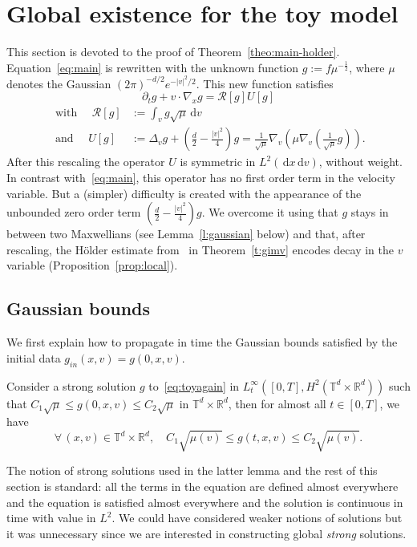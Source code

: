 \documentclass[AHL,Unicode,longabstracts,published]{cedram}
\newcommand{\R}{\mathbb{R}}
\newcommand{\T}{\mathbb{T}}
\newcommand*\fR{\mathcal{R}}
\newcommand{\dd}{{\, \mathrm d}}
\let\oldforall\forall
\renewcommand*{\forall}{\mathrel{\oldforall}}
\begin{document}
\section{Global existence for the toy model}\label{sec:toy}

This section is devoted to the proof of Theorem~\ref{theo:main-holder}. Equation~\eqref{eq:main} is rewritten with the unknown function $g := f \mu^{-\frac12}$, where $\mu$ denotes the Gaussian $(2\pi)^{-d/2} e^{-|v|^2/2}$. This new function satisfies
\begin{equation}\label{eq:toyagain}
\partial_t g + v \cdot \nabla_x g = \fR[g] U[g]
\end{equation}
\begin{align*}
 \text{ with } \quad
\fR[g] &:= \int_v g \sqrt\mu \dd v \\
\text{ and } \quad U[g] &:=
\Delta_v g + \left(\frac{d}2 - \frac{|v|^2}{4}\right) g =
\frac1{\sqrt{\mu}} \nabla_v \left(\mu \nabla_v
\left(\frac{1}{\sqrt{\mu}} g\right)\right).
\end{align*}
After this rescaling the operator $U$ is symmetric in $L^2(\dd x \dd v)$, without weight. In contrast with~\eqref{eq:main}, this operator has no first order term in the velocity variable. But a (simpler) difficulty is created with the appearance of the unbounded zero order term $(\tfrac{d}2 - \tfrac{|v|^2}4)g$. We overcome it using that $g$ stays in between two Maxwellians (see Lemma~\ref{l:gaussian} below) and that, after rescaling, the H\"older estimate from~\cite{gimv,wz09} in Theorem~\ref{t:gimv} encodes decay in the $v$ variable (Proposition~\ref{prop:local}).

\subsection{Gaussian bounds}

We first explain how to propagate in time the Gaussian bounds satisfied by the initial data $g_{in} (x,v) = g(0,x,v)$.
\begin{lemm}\label{l:gaussian}
Consider a strong solution $g$ to~\eqref{eq:toyagain} in $L^\infty_t([0,T],H^2(\T^d\times\R^d))$ such that $C_1 \sqrt{\mu} \le g(0,x,v) \le C_2 \sqrt{\mu}$ in $\T^d \times \R^d$, then for almost all $t \in [0,T]$, we have
\[
\forall \, (x,v) \in \T^d \times \R^d, \quad C_1 \sqrt{\mu(v)} \le g(t,x,v) \le C_2 \sqrt{\mu(v)}.
\]
\end{lemm}


\begin{rema}
The notion of strong solutions used in the latter lemma and the rest of this section is standard: all the terms in the equation are defined almost everywhere and the equation is satisfied almost everywhere and the solution is continuous in time with value in $L^2$. We could have considered weaker notions of solutions but it was unnecessary since we are interested in constructing global
\emph{strong} solutions.
\end{rema}
\end{document}
